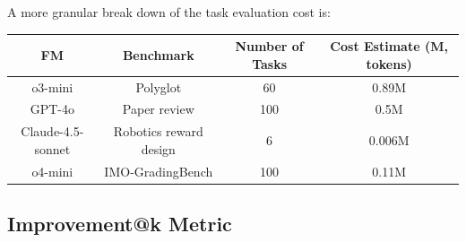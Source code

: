 \documentclass{article}
\begin{document}

A more granular break down of the task evaluation cost is:

\begin{table}[H]
\centering
\begin{tabular}{@{}cccc@{}}
\toprule
\textbf{FM} & \textbf{Benchmark} & \textbf{Number of Tasks} & \textbf{Cost Estimate (M, tokens)} \\ \midrule
o3-mini & Polyglot & 60 & 0.89M \\
GPT-4o & Paper review & 100 & 0.5M \\
Claude-4.5-sonnet & Robotics reward design & 6 & 0.006M \\
o4-mini & IMO-GradingBench & 100 & 0.11M \\ \bottomrule
\end{tabular}
\end{table}

\subsection{Improvement@k Metric}
\label{app:genk-metric}

\end{document}
